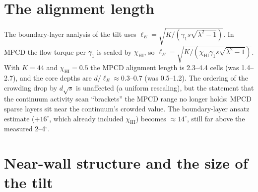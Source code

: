 \documentclass[11pt,a4paper]{article}
\begin{document}
\section{The alignment length}
The boundary-layer analysis of the tilt uses $\ell_E=\sqrt{K/(\gamma_1 s\sqrt{\lambda^2-1})}$. In MPCD the flow torque per $\gamma_1$ is scaled by
$\chi_\mathrm{HI}$, so $\ell_E=\sqrt{K/(\chi_\mathrm{HI}\gamma_1 s\sqrt{\lambda^2-1})}$. With $K=44$ and $\chi_\mathrm{HI}=0.5$ the MPCD alignment length is
2.3--4.4 cells (was 1.4--2.7), and the core depths are $d/\ell_E\approx0.3$--0.7 (was 0.5--1.2). The ordering of the crowding drop by $d\sqrt s$ is
unaffected (a uniform rescaling), but the statement that the continuum activity scan ``brackets'' the MPCD range no longer holds: MPCD sparse layers
sit near the continuum's crowded value. The boundary-layer ansatz estimate ($+16^\circ$, which already included $\chi_\mathrm{HI}$) becomes $\approx14^\circ$,
still far above the measured 2--4$^\circ$.

\section{Near-wall structure and the size of the tilt}\label{sec:nearwall}
\end{document}
